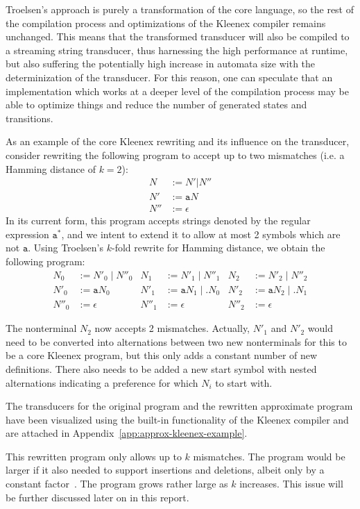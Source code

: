 Troelsen's approach is purely a transformation of the core language, so the
rest of the compilation process and optimizations of the Kleenex compiler
remains unchanged. This means that the transformed transducer will also be
compiled to a streaming string transducer, thus harnessing the high performance
at runtime, but also suffering the potentially high increase in automata size
with the determinization of the transducer. For this reason, one can speculate
that an implementation which works at a deeper level of the compilation process
may be able to optimize things and reduce the number of generated states and
transitions.


As an example of the core Kleenex rewriting and its influence on the
transducer, consider rewriting the following program to accept up to two
mismatches (i.e. a Hamming distance of $k=2$):
\begin{align*}
  N   &:= N' | N''      \\
  N'  &:= \mathtt{a} N  \\
  N'' &:= \epsilon
\end{align*}
In its current form, this program accepts strings denoted by the regular
expression $\mathtt{a^*}$, and we intent to extend it to allow at most 2
symbols which are not $\mathtt{a}$. Using Troelsen's $k$-fold rewrite for
Hamming distance, we obtain the following program:
\begin{align*}
  N_0   &:= N'_0 \;|\; N''_0  &  N_1   &:= N'_1 \;|\; N''_1           & N_2   &:= N'_2 \;|\; N''_2           \\
  N'_0  &:= \mathtt{a} N_0    &  N'_1  &:= \mathtt{a} N_1 \;|\; . N_0 & N'_2  &:= \mathtt{a} N_2 \;|\; . N_1 \\
  N''_0 &:= \epsilon          &  N''_1 &:= \epsilon                   & N''_2 &:= \epsilon
\end{align*}

The nonterminal $N_2$ now accepts 2 mismatches. Actually, $N'_1$ and $N'_2$
would need to be converted into alternations between two new nonterminals for
this to be a core Kleenex program, but this only adds a constant number of new
definitions. There also needs to be added a new start symbol with nested
alternations indicating a preference for which $N_i$ to start with.

The transducers for the original program and the rewritten approximate program
have been visualized using the built-in functionality of the Kleenex compiler
and are attached in Appendix~\ref{app:approx-kleenex-example}.

This rewritten program only allows up to $k$ mismatches. The program would be
larger if it also needed to support insertions and deletions, albeit only by a
constant factor~\cite{troelsen2016approximate}. The program grows rather large
as $k$ increases. This issue will be further discussed later on in this report.

